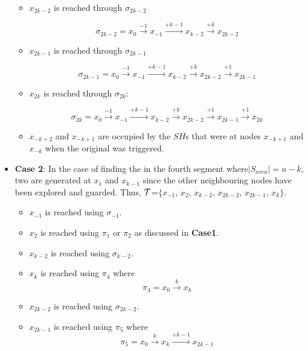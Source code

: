 \begin{itemize}
\begin{itemize}


\item $x_{2k-2}$ is reached through $\sigma_{2k-2}$
 
$$\sigma_{2k-2} = x_{0} \xrightarrow {-1} x_{-1} \xrightarrow {+k-1} x_{k-2} \xrightarrow {+k} x_{2k-2} $$



\item $x_{2k-1}$ is reached through $\sigma_{2k-1}$
 
$$\sigma_{2k-1} = x_{0} \xrightarrow {-1} x_{-1} \xrightarrow {+k-1} x_{k-2} \xrightarrow {+k} x_{2k-2} \xrightarrow {+1}  x_{2k-1}$$


\item $x_{2k}$ is reached through $\sigma_{2k}$:
 
$$\sigma_{2k} = x_{0} \xrightarrow {-1} x_{-1} \xrightarrow {+k-1} x_{k-2} \xrightarrow {+k} x_{2k-2} \xrightarrow {+1}  x_{2k-1}\xrightarrow {+1}  x_{2k}$$



\item $x_{-k+2}$ and $x_{-k+1}$ are occupied by the $SH$s that were at nodes  $x_{-k+1}$ and $x_{-k}$ when the original \bv was triggered.
\end{itemize}



 \item {\bf Case 2}: In the case of finding the \bv in the fourth segment where$ |S_{area}| =n-k$, two \bvs are generated  at $x_1$ and $x_{k-1}$ since the other neighbouring nodes have been explored and guarded. Thus,
$\cal T$=$\{x_{-1}$, $x_{2}$, $x_{k-2}$, $x_{2k-2}$, $x_{2k-1}$, $x_{k}\}$.
\begin{itemize}
\item $x_{-1}$ is reached using $\sigma_{-1}$.
\item $x_{2}$ is reached using $\pi_1$ or $\pi_2$ as discussed in {\bf Case1}.

\item $x_{k-2}$ is reached using $\sigma_{k-2}$.
\item $x_{k}$ is reached using $\pi_{4}$ where
$$\pi_{4} = x_{0} \xrightarrow {k} x_{k}$$
\item $x_{2k-2}$ is reached using $\sigma_{2k-2}$.
\item $x_{2k-1}$ is reached using $\pi_{5}$ where
$$\pi_{5} = x_{0} \xrightarrow {k} x_{k}\xrightarrow {+k-1} x_{2k-1}$$




\end{itemize}
\end{itemize}
